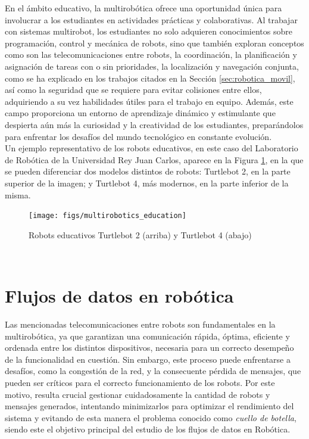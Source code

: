 En el ámbito educativo, la multirobótica ofrece una oportunidad única para
involucrar a los estudiantes en actividades prácticas y colaborativas.
Al trabajar con sistemas multirobot, los estudiantes no solo adquieren
conocimientos sobre programación, control y mecánica de robots, sino que también
exploran conceptos como son las telecomunicaciones entre robots, la coordinación,
la planificación y asignación de tareas con o sin prioridades, la localización y
navegación conjunta, como se ha explicado en los trabajos citados en la Sección
\ref{sec:robotica_movil}, así como la seguridad que se requiere para evitar
colisiones entre ellos, adquiriendo a su vez habilidades útiles para el trabajo
en equipo.
Además, este campo proporciona un entorno de aprendizaje dinámico y estimulante
que despierta aún más la curiosidad y la creatividad de los estudiantes,
preparándolos para enfrentar los desafíos del mundo tecnológico en constante
evolución.
\\

Un ejemplo representativo de los robots educativos, en este caso del Laboratorio
de Robótica de la Universidad Rey Juan Carlos, aparece en la Figura
\ref{fig:robots_education}, en la que se pueden diferenciar dos modelos
distintos de robots: Turtlebot 2, en la parte superior de la imagen; y Turtlebot
4, más modernos, en la parte inferior de la misma.

\begin{figure} [h!]
  \begin{center}
    \texttt{[image: figs/multirobotics\_education]}
  \end{center}
  \caption{Robots educativos Turtlebot 2 (arriba) y Turtlebot 4 (abajo)}
  \label{fig:robots_education}
\end{figure}\



\section{Flujos de datos en robótica}
\label{sec:flujos_datos} %

Las mencionadas telecomunicaciones entre robots son fundamentales en la
multirobótica, ya que garantizan una comunicación rápida, óptima, eficiente y
ordenada entre los distintos dispositivos, necesaria para un correcto desempeño
de la funcionalidad en cuestión.
Sin embargo, este proceso puede enfrentarse a desafíos, como la congestión de la
red, y la consecuente pérdida de mensajes, que pueden ser críticos para el
correcto funcionamiento de los robots.
Por este motivo, resulta crucial gestionar cuidadosamente la cantidad de robots
y mensajes generados, intentando minimizarlos para optimizar el rendimiento del
sistema y evitando de esta manera el problema conocido como \textit{cuello de
botella}, siendo este el objetivo principal del estudio de los flujos de datos
en Robótica.
\\

